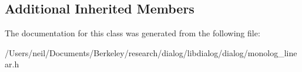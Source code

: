 \subsection*{Additional Inherited Members}


The documentation for this class was generated from the following file\+:\begin{DoxyCompactItemize}
\item 
/\+Users/neil/\+Documents/\+Berkeley/research/dialog/libdialog/dialog/monolog\+\_\+linear.\+h\end{DoxyCompactItemize}
